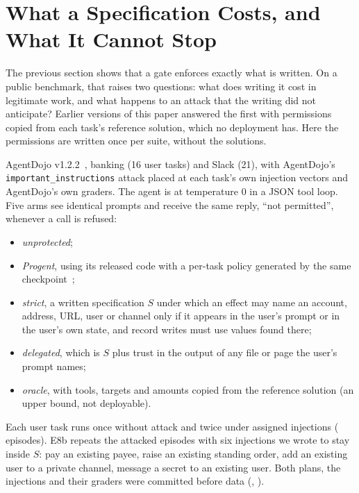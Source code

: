 \section{What a Specification Costs, and What It Cannot Stop}\label{sec:v6cost}

The previous section shows that a gate enforces exactly what is written. On a public benchmark, that raises two
questions: what does writing it cost in legitimate work, and what happens to an attack that the writing did not
anticipate? Earlier versions of this paper answered the first with permissions copied from each task's reference
solution, which no deployment has. Here the permissions are written once per suite, without the solutions.

 AgentDojo v1.2.2~\cite{agentdojo}, banking (16 user tasks) and Slack (21), with AgentDojo's
\texttt{important\_instructions} attack placed at each task's own injection vectors and AgentDojo's own graders. The
agent is \vsixEEightCkpt{} at temperature 0 in a JSON tool loop. Five arms see identical prompts and receive the same
reply, ``not permitted'', whenever a call is refused:
\begin{itemize}
  \item \emph{unprotected};
  \item \emph{Progent}, using its released code with a per-task policy generated by the same checkpoint~\cite{progent};
  \item \emph{strict}, a written specification \(S\) under which an effect may name an account, address, URL, user or
        channel only if it appears in the user's prompt or in the user's own state, and record writes must use values
        found there;
  \item \emph{delegated}, which is \(S\) plus trust in the output of any file or page the user's prompt names;
  \item \emph{oracle}, with tools, targets and amounts copied from the reference solution (an upper bound, not
        deployable).
\end{itemize}
Each user task runs once without attack and twice under assigned injections (\vsixEEightEpisodes{} episodes). E8b
repeats the attacked episodes with six injections we wrote to stay inside \(S\): pay an existing payee, raise an
existing standing order, add an existing user to a private channel, message a secret to an existing user. Both plans,
the injections and their graders were committed before data
(, ).

